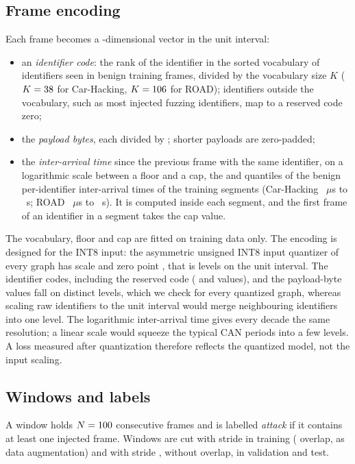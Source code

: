 \subsection{Frame encoding}
Each frame becomes a \NFeatures-dimensional vector in the unit interval:
\begin{itemize}
\item an \emph{identifier code}: the rank of the identifier in the sorted vocabulary of identifiers seen in benign
training frames, divided by the vocabulary size $K$ ($K=38$ for Car-Hacking, $K=106$ for ROAD);
identifiers outside the vocabulary, such as most injected fuzzing identifiers, map to a reserved code zero;
\item the \NPayloadBytes{} \emph{payload bytes}, each divided by \ByteScale; shorter payloads are zero-padded;
\item the \emph{inter-arrival time} since the previous frame with the same identifier, on a logarithmic scale
between a floor and a cap, the \IATFloorQ{} and \IATCapQ{} quantiles of the benign per-identifier inter-arrival
times of the training segments (Car-Hacking \IATFloorUsCH~$\mu$s to \IATCapSCH~s; ROAD \IATFloorUsROAD~$\mu$s to
\IATCapSROAD~s). It is computed inside each segment, and the first frame of an identifier in a segment takes the
cap value.
\end{itemize}
The vocabulary, floor and cap are fitted on training data only. The encoding is designed for the INT8 input: the
asymmetric unsigned INT8 input quantizer of every \Qint{} graph has scale \InputScale{} and zero point
\InputZeroPoint, that is \InputLevels{} levels on the unit interval. The identifier codes, including the reserved
code (\IdLevelsCH{} and \IdLevelsROAD{} values), and the payload-byte values fall on distinct levels, which we check for every quantized graph, whereas scaling raw
identifiers to the unit interval would merge neighbouring identifiers into one level. The logarithmic
inter-arrival time gives every decade the same resolution; a linear scale would squeeze the typical CAN periods
into a few levels. A loss measured after quantization therefore reflects the quantized model, not the input
scaling.

\subsection{Windows and labels}
A window holds $N=100$ consecutive frames and is labelled \emph{attack} if it contains at least one injected
frame. Windows are cut with stride \StrideTrain{} in training (\OverlapTrainPct{} overlap, as data augmentation)
and with stride \StrideEval, without overlap, in validation and test.

